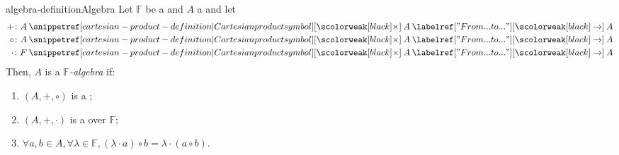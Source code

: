 \documentclass[preview]{standalone}
\begin{document}
\begin{snippetdefinition}{algebra-definition}{Algebra}
    Let \(\mathbb{F}\) be a \field and \(A\) a \set and let
    \begin{align*}
        + \colon A \cartesianprod A \fromto A \\
        \circ \colon A \cartesianprod A \fromto A \\
        \cdot \colon F \cartesianprod A \fromto A
    \end{align*}
    Then, \(A\) is a \emph{\(\mathbb{F}\)-algebra} if:
    \begin{enumerate}
        \item \((A, +, \circ)\) is a \ring;
        \item \((A, +, \cdot)\) is a \vectorspace over \(\mathbb{F}\);
        \item \(\forall a,b \in A, \forall \lambda \in \mathbb{F}, (\lambda \cdot a) \circ b = \lambda \cdot (a\circ b)\).
    \end{enumerate}
\end{snippetdefinition}
\end{document}
